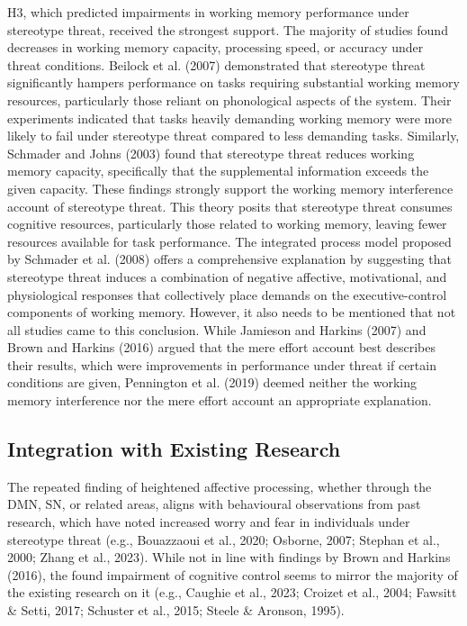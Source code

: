 \documentclass[
  stu, a4paper, 12pt,mask,floatsintext]{apa7}
\begin{document}
H3, which predicted impairments in working memory performance under stereotype threat, received the strongest support.
The majority of studies found decreases in working memory capacity, processing speed, or accuracy under threat conditions.
Beilock et al. (2007) demonstrated that stereotype threat significantly hampers performance on tasks requiring substantial working memory resources, particularly those reliant on phonological aspects of the system.
Their experiments indicated that tasks heavily demanding working memory were more likely to fail under stereotype threat compared to less demanding tasks.
Similarly, Schmader and Johns (2003) found that stereotype threat reduces working memory capacity, specifically that the supplemental information exceeds the given capacity.
These findings strongly support the working memory interference account of stereotype threat.
This theory posits that stereotype threat consumes cognitive resources, particularly those related to working memory, leaving fewer resources available for task performance.
The integrated process model proposed by Schmader et al. (2008) offers a comprehensive explanation by suggesting that stereotype threat induces a combination of negative affective, motivational, and physiological responses that collectively place demands on the executive-control components of working memory.
However, it also needs to be mentioned that not all studies came to this conclusion.
While Jamieson and Harkins (2007) and Brown and Harkins (2016) argued that the mere effort account best describes their results, which were improvements in performance under threat if certain conditions are given, Pennington et al. (2019) deemed neither the working memory interference nor the mere effort account an appropriate explanation.

\subsection{Integration with Existing Research}\label{integration-with-existing-research}

The repeated finding of heightened affective processing, whether through the DMN, SN, or related areas, aligns with behavioural observations from past research, which have noted increased worry and fear in individuals under stereotype threat (e.g., Bouazzaoui et al., 2020; Osborne, 2007; Stephan et al., 2000; Zhang et al., 2023).
While not in line with findings by Brown and Harkins (2016), the found impairment of cognitive control seems to mirror the majority of the existing research on it (e.g., Caughie et al., 2023; Croizet et al., 2004; Fawsitt \& Setti, 2017; Schuster et al., 2015; Steele \& Aronson, 1995).
\end{document}
